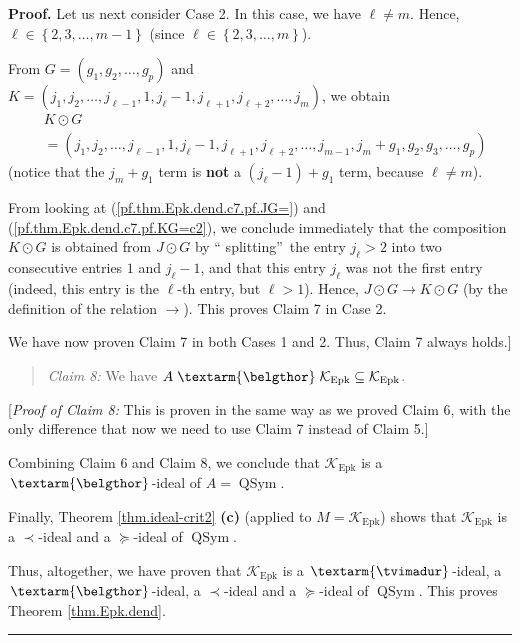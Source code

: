 \documentclass[numbers=enddot,12pt,final,onecolumn,notitlepage]{scrartcl}%
\theoremstyle{definition}
\newenvironment{statement}{\begin{quote}}{\end{quote}}
\newenvironment{proof}[1][Proof]{\noindent\textbf{#1.} }{\ \rule{0.5em}{0.5em}}
\newcommand{\tvi}{\left. \textarm{\tvimadur} \right.}
\newcommand{\bel}{\left. \textarm{\belgthor} \right.}
\begin{document}
\begin{proof}
Let us next consider Case 2. In this case, we have $\ell\neq m$. Hence,
$\ell\in\left\{  2,3,\ldots,m-1\right\}  $ (since $\ell\in\left\{
2,3,\ldots,m\right\}  $).

From $G=\left(  g_{1},g_{2},\ldots,g_{p}\right)  $ and $K=\left(  j_{1}%
,j_{2},\ldots,j_{\ell-1},1,j_{\ell}-1,j_{\ell+1},j_{\ell+2},\ldots
,j_{m}\right)  $, we obtain%
\begin{align}
&  K\odot G\nonumber\\
&  =\left(  j_{1},j_{2},\ldots,j_{\ell-1},1,j_{\ell}-1,j_{\ell+1},j_{\ell
+2},\ldots,j_{m-1},j_{m}+g_{1},g_{2},g_{3},\ldots,g_{p}\right)
\label{pf.thm.Epk.dend.c7.pf.KG=c2}%
\end{align}
(notice that the $j_{m}+g_{1}$ term is \textbf{not} a $\left(  j_{\ell
}-1\right)  +g_{1}$ term, because $\ell\neq m$).

From looking at (\ref{pf.thm.Epk.dend.c7.pf.JG=}) and
(\ref{pf.thm.Epk.dend.c7.pf.KG=c2}), we conclude immediately that the
composition $K\odot G$ is obtained from $J\odot G$ by \textquotedblleft
splitting\textquotedblright\ the entry $j_{\ell}>2$ into two consecutive
entries $1$ and $j_{\ell}-1$, and that this entry $j_{\ell}$ was not the first
entry (indeed, this entry is the $\ell$-th entry, but $\ell>1$). Hence,
$J\odot G\rightarrow K\odot G$ (by the definition of the relation
$\rightarrow$). This proves Claim 7 in Case 2.

We have now proven Claim 7 in both Cases 1 and 2. Thus, Claim 7 always holds.]

\begin{statement}
\textit{Claim 8:} We have $A\bel  \mathcal{K}_{\operatorname*{Epk}}%
\subseteq\mathcal{K}_{\operatorname*{Epk}}$.
\end{statement}

[\textit{Proof of Claim 8:} This is proven in the same way as we proved Claim
6, with the only difference that now we need to use Claim 7 instead of Claim 5.]

Combining Claim 6 and Claim 8, we conclude that $\mathcal{K}%
_{\operatorname*{Epk}}$ is a $\bel  $-ideal of $A=\operatorname*{QSym}$.

Finally, Theorem \ref{thm.ideal-crit2} \textbf{(c)} (applied to $M=\mathcal{K}%
_{\operatorname*{Epk}}$) shows that $\mathcal{K}_{\operatorname*{Epk}}$ is a
$\left.  \prec\right.  $-ideal and a $\left.  \succeq\right.  $-ideal of
$\operatorname*{QSym}$.

Thus, altogether, we have proven that $\mathcal{K}_{\operatorname*{Epk}}$ is a
$\tvi$-ideal, a $\bel$-ideal, a $\left.  \prec\right.  $-ideal and a $\left.
\succeq\right.  $-ideal of $\operatorname*{QSym}$. This proves Theorem
\ref{thm.Epk.dend}.
\end{proof}
\end{document}

